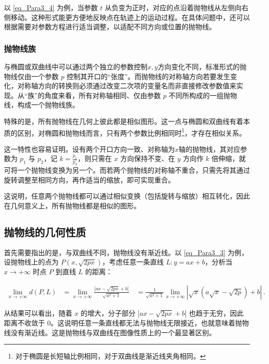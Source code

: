 以 \autoref{eq_Para3_4} 为例，当参数 $t$ 从负变为正时，对应的点沿着抛物线从左侧向右侧移动。这种形式能更方便地反映点在轨迹上的运动过程。在具体问题中，还可以根据需要对参数方程进行适当调整，以适配不同方向或位置的抛物线。

\subsubsection{抛物线族}

与椭圆或双曲线中可以通过两个独立的参数控制$x,y$方向变化不同，标准形式的抛物线仅由一个参数 $p$ 控制其开口的“张度”。而抛物线的对称轴方向若要发生变化，对称轴方向的转换则必须通过改变二次项的变量名而非直接修改参数值来实现。从“族”的角度来看，所有对称轴相同、仅由参数 $p$ 不同所构成的一组抛物线，构成一个抛物线族。

特殊的是，所有抛物线在几何上彼此都是相似图形。这一点与椭圆和双曲线有着本质的区别，对椭圆和抛物线而言，只有两个参数比例相同时\footnote{对于椭圆是长短轴比例相同，对于双曲线是渐近线夹角相同。}，才存在相似关系。

这一特性也容易证明。设有两个开口方向一致、对称轴为$x$轴的抛物线，其对应参数为 $p_1$ 与 $p_2$，记 $\displaystyle k = \frac{p_1}{p_2}$，则只需在 $x$ 方向保持不变、在 $y$ 方向作 $k$ 倍伸缩，就可将一个抛物线变换为另一个。而若两个抛物线的对称轴不重合，只需先将其通过旋转调整至相同方向，再作适当的缩放，即可实现重合。

这说明，任意两个抛物线都可以通过相似变换（包括旋转与缩放）相互转化，因此在几何意义上，所有抛物线都是相似的图形。

\subsection{抛物线的几何性质}

首先需要指出的是，与双曲线不同，抛物线没有渐近线。以 \autoref{eq_Para3_3} 为例，设抛物线上的点为 $P(x, \sqrt{2px})$，考虑任意一条直线 $L: y = ax + b$，分析当 $x \to +\infty$ 时点 $P$ 到直线 $L$ 的距离：

\begin{equation}
\begin{split}
\lim_{x \to +\infty} d(P, L)
&= \lim_{x \to +\infty} \frac{|ax - \sqrt{2px} + b|}{\sqrt{a^2 + 1}}\
&= \frac{1}{\sqrt{a^2 + 1}} \lim_{x \to +\infty} | \sqrt{x} \left( a\sqrt{x} - \sqrt{2p} \right) + b |~.
\end{split}
\end{equation}

从结果可以看出，随着 $x$ 的增大，分子部分 $|ax - \sqrt{2px} + b|$ 也趋于无穷，因此距离不收敛于 $0$。这说明任意一条直线都无法与抛物线无限接近，也就意味着抛物线没有渐近线。这是抛物线与双曲线在图像性质上的一个最显著区别。


